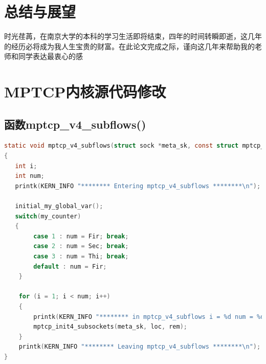 \documentclass[winfonts,bachelor,oneside,nobackinfo]{njuthesis}
\begin{document}
\chapter{总结与展望}
\lipsum[1]



\begin{acknowledgement}
时光荏苒，在南京大学的本科的学习生活即将结束，四年的时间转瞬即逝，这几年的经历必将成为我人生宝贵的财富。在此论文完成之际，谨向这几年来帮助我的老师和同学表达最衷心的感

\end{acknowledgement}








\appendix
\chapter{MPTCP内核源代码修改}\label{app:1}
\section{函数mptcp\_v4\_subflows()}
\begin{lstlisting}[language=C]
static void mptcp_v4_subflows(struct sock *meta_sk, const struct mptcp_loc4 *loc, struct mptcp_rem4 *rem)
{
   int i;
   int num;
   printk(KERN_INFO "******** Entering mptcp_v4_subflows ********\n");

   initial_my_global_var();
   switch(my_counter)
   {
		case 1 : num = Fir; break;
		case 2 : num = Sec; break;
		case 3 : num = Thi; break;
		default : num = Fir;
	}

	for (i = 1; i < num; i++)
	{
		printk(KERN_INFO "******** in mptcp_v4_subflows i = %d num = %d********\n",i,num);
		mptcp_init4_subsockets(meta_sk, loc, rem);
	}
	printk(KERN_INFO "******** Leaving mptcp_v4_subflows ********\n");
}
\end{lstlisting}
\end{document}
